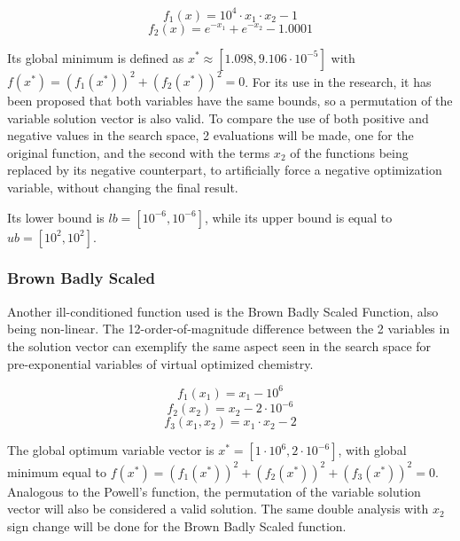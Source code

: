 \documentclass[10pt,fleqn,a4paper,twoside]{article}
\begin{document}
\begin{equation}
f_1(x) = 10^4 \cdot x_1 \cdot x_2 -1
\label{Eq:powell1}
\end{equation}
\begin{equation}
f_2(x) = e^{-x_1} + e^{-x_2} - 1.0001 
\label{Eq:powell2}
\end{equation}

Its global minimum is defined as $x^* \approx [1.098, 9.106\cdot10^{-5}]$ with $f(x^*) = (f_1(x^*))^2 + (f_2(x^*))^2 = 0$. For its use in the research, it has been proposed that 
both variables have the same bounds, so a permutation of the variable solution vector is also valid. To compare the use of both positive and negative values in the search space,
2 evaluations will be made, one for the original function, and the second with the terms $x_2$ of the functions being replaced by its negative counterpart, to artificially force a negative 
optimization variable, without changing the final result.

Its lower bound is $lb = [10^{-6}, 10^{-6}]$, while its upper bound is equal to $ub = [10^{2}, 10^{2}]$.


\subsubsection{Brown Badly Scaled}
Another ill-conditioned function used is the Brown Badly Scaled Function, also being non-linear.  The 12-order-of-magnitude difference between the 2 variables in the solution 
vector can exemplify the same aspect seen in the search space for pre-exponential variables of virtual optimized chemistry.

\begin{equation}
f_1(x_1) = x_1 - 10^{6}
\label{Eq:brown1} 
\end{equation}
\begin{equation}
f_2(x_2) = x_2 - 2\cdot 10^{-6}
\label{Eq:brown2}
\end{equation}
\begin{equation}
f_3(x_1,x_2) = x_1 \cdot x_2 - 2
\label{Eq:brown3}
\end{equation}

The global optimum variable vector is $x^* = [1\cdot10^6, 2\cdot10^{ -6} ]$, with global minimum equal to $f(x^*) = (f_1(x^*))^2 + (f_2(x^*))^2 + (f_3(x^*))^2= 0$. Analogous to 
the Powell's function, the permutation of the variable solution vector will also be considered a valid solution. The same double analysis with $x_2$ sign change will be done for the Brown
Badly Scaled function.
\end{document}
